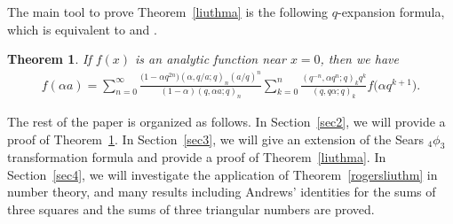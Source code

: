 \documentclass[10pt,a4paper]{amsart}
\numberwithin{equation}{section}
\newtheorem{Theorem}{Theorem}[section]
\begin{document}
The main tool to prove Theorem~\ref{liuthma} is the following
$q$-expansion formula, which is equivalent to \cite[Theorem~2]{Liu2002} and \cite[Theorem~1.1]{Liu2013RamanJ}.
\begin{Theorem}\label{liuthm} If $f(x)$ is an analytic function near $x=0$, then we have
	\begin{align}\label{newliuexpthm}
		f(\alpha a)
		=\sum_{n=0}^\infty \frac{\bigl(1-\alpha q^{2n}\bigr)(\alpha, q/a; q)_n (a/q)^n}
		{(1-\alpha)(q, \alpha a; q)_n} \sum_{k=0}^n \frac{(q^{-n}, \alpha q^n; q)_k q^k}
		{(q, q\alpha; q)_k} f\bigl(\alpha q^{k+1}\bigr).
	\end{align}
\end{Theorem}
The rest of the paper is organized as follows. In Section~\ref{sec2}, we will provide a proof of Theorem~\ref{liuthm}. In Section~\ref{sec3}, we will give an extension of the Sears $_4\phi_3$ transformation formula and provide a proof of Theorem~\ref{liuthma}. In Section~\ref{sec4}, we will investigate the application of Theorem~\ref{rogersliuthm} in number theory, and many results including Andrews' identities for the sums of three squares and the sums of three triangular numbers are proved.
\end{document}

